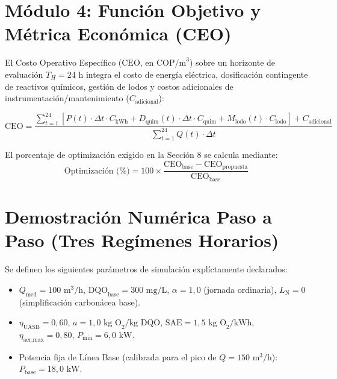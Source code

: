 \documentclass[11pt, a4paper]{article}
\begin{document}
\section{Módulo 4: Función Objetivo y Métrica Económica (CEO)}

El Costo Operativo Específico ($\text{CEO}$, en $\text{COP/m}^3$) sobre un horizonte de evaluación $T_H = 24\text{ h}$ integra el costo de energía eléctrica, dosificación contingente de reactivos químicos, gestión de lodos y costos adicionales de instrumentación/mantenimiento ($C_{\text{adicional}}$):

\begin{equation}
    \text{CEO} = \frac{\displaystyle\sum_{t=1}^{24} \left[ P(t) \cdot \Delta t \cdot C_{\text{kWh}} + D_{\text{quim}}(t) \cdot \Delta t \cdot C_{\text{quim}} + M_{\text{lodo}}(t) \cdot C_{\text{lodo}} \right] + C_{\text{adicional}}}{\displaystyle\sum_{t=1}^{24} Q(t) \cdot \Delta t}
    \label{eq:ceo}
\end{equation}

El porcentaje de optimización exigido en la Sección 8 se calcula mediante:
\begin{equation}
    \text{Optimización (\%)} = 100 \times \frac{\text{CEO}_{\text{base}} - \text{CEO}_{\text{propuesta}}}{\text{CEO}_{\text{base}}}
    \label{eq:optimizacion}
\end{equation}

\section{Demostración Numérica Paso a Paso (Tres Regímenes Horarios)}

Se definen los siguientes parámetros de simulación explíctamente declarados:
\begin{itemize}
    \item $Q_{\text{med}} = 100\text{ m}^3/\text{h}$, $\text{DQO}_{\text{base}} = 300\text{ mg/L}$, $\alpha = 1{,}0$ (jornada ordinaria), $L_{\text{N}} = 0$ (simplificación carbonácea base).
    \item $\eta_{\text{UASB}} = 0{,}60$, $a = 1{,}0\text{ kg O}_2/\text{kg DQO}$, $\text{SAE} = 1{,}5\text{ kg O}_2/\text{kWh}$, $\eta_{\text{aer,max}} = 0{,}80$, $P_{\text{min}} = 6{,}0\text{ kW}$.
    \item Potencia fija de Línea Base (calibrada para el pico de $Q = 150\text{ m}^3/\text{h}$): $P_{\text{base}} = 18{,}0\text{ kW}$.
\end{itemize}
\end{document}
